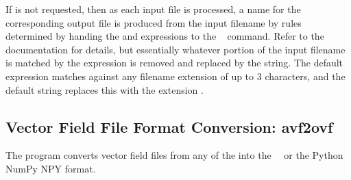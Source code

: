 If  is not requested, then as each input file is
processed, a name for the corresponding output file is produced from
the input filename by rules determined by handing the 
and  expressions to the \Tcl\  command.  Refer
to the \Tcl\  documentation for details, but essentially
whatever portion of the input filename is matched by the 
expression is removed and replaced by the  string.  The
default  expression matches against any filename
extension of up to 3 characters, and the default  string
replaces this with the extension .


\subsection{Vector Field File Format Conversion:
          avf2ovf}\label{sec:avf2ovf}%
%
The  program converts vector field files from any of the
 into the \OOMMF\ \OVF\ or the Python NumPy NPY format.

